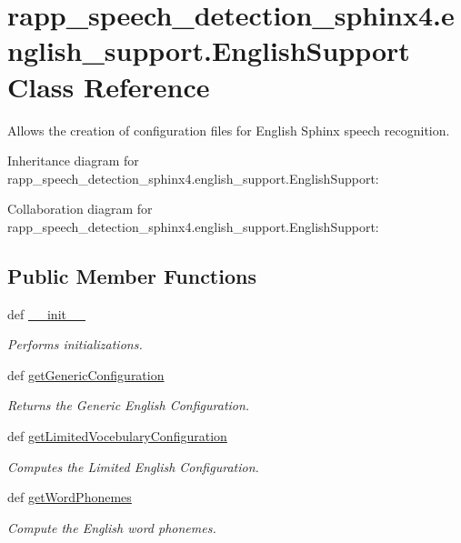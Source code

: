 \hypertarget{classrapp__speech__detection__sphinx4_1_1english__support_1_1EnglishSupport}{\section{rapp\-\_\-speech\-\_\-detection\-\_\-sphinx4.\-english\-\_\-support.\-English\-Support Class Reference}
\label{classrapp__speech__detection__sphinx4_1_1english__support_1_1EnglishSupport}
}


Allows the creation of configuration files for English Sphinx speech recognition.  




Inheritance diagram for rapp\-\_\-speech\-\_\-detection\-\_\-sphinx4.\-english\-\_\-support.\-English\-Support\-:


Collaboration diagram for rapp\-\_\-speech\-\_\-detection\-\_\-sphinx4.\-english\-\_\-support.\-English\-Support\-:
\subsection*{Public Member Functions}
\begin{DoxyCompactItemize}
\item 
def \hyperlink{classrapp__speech__detection__sphinx4_1_1english__support_1_1EnglishSupport_a399297def83e8843368fb4a1d3ca526b}{\-\_\-\-\_\-init\-\_\-\-\_\-}
\begin{DoxyCompactList}\small\item\em Performs initializations. \end{DoxyCompactList}\item 
def \hyperlink{classrapp__speech__detection__sphinx4_1_1english__support_1_1EnglishSupport_afc762995b000472cb6746cc8e6a427c9}{get\-Generic\-Configuration}
\begin{DoxyCompactList}\small\item\em Returns the Generic English Configuration. \end{DoxyCompactList}\item 
def \hyperlink{classrapp__speech__detection__sphinx4_1_1english__support_1_1EnglishSupport_aee8fe0bceba35b725d6cf04ab7213016}{get\-Limited\-Vocebulary\-Configuration}
\begin{DoxyCompactList}\small\item\em Computes the Limited English Configuration. \end{DoxyCompactList}\item 
def \hyperlink{classrapp__speech__detection__sphinx4_1_1english__support_1_1EnglishSupport_a6b2a2e85a48b8c2887facecdb42ae251}{get\-Word\-Phonemes}
\begin{DoxyCompactList}\small\item\em Compute the English word phonemes. \end{DoxyCompactList}\end{DoxyCompactItemize}

